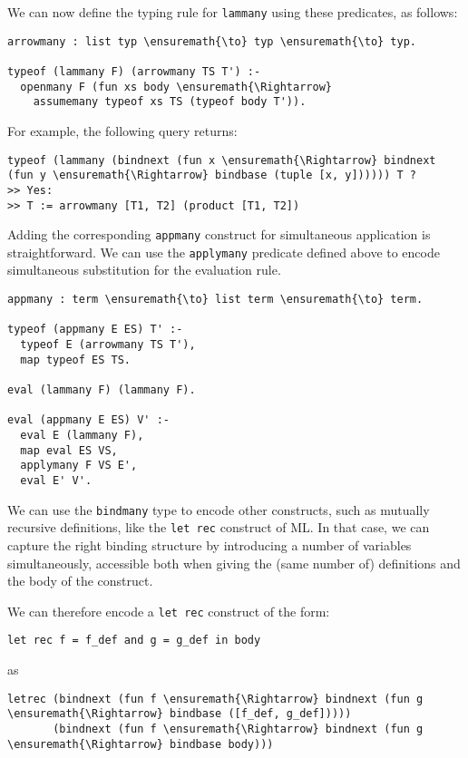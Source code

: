 We can now define the typing rule for \texttt{lammany} using these
predicates, as follows:

\begin{verbatim}
arrowmany : list typ \ensuremath{\to} typ \ensuremath{\to} typ.

typeof (lammany F) (arrowmany TS T') :-
  openmany F (fun xs body \ensuremath{\Rightarrow}
    assumemany typeof xs TS (typeof body T')).
\end{verbatim}

For example, the following query returns:

\begin{verbatim}
typeof (lammany (bindnext (fun x \ensuremath{\Rightarrow} bindnext (fun y \ensuremath{\Rightarrow} bindbase (tuple [x, y]))))) T ?
>> Yes:
>> T := arrowmany [T1, T2] (product [T1, T2])
\end{verbatim}

Adding the corresponding \texttt{appmany} construct for simultaneous
application is straightforward. We can use the \texttt{applymany}
predicate defined above to encode simultaneous substitution for the
evaluation rule.

\begin{verbatim}
appmany : term \ensuremath{\to} list term \ensuremath{\to} term.

typeof (appmany E ES) T' :-
  typeof E (arrowmany TS T'),
  map typeof ES TS.

eval (lammany F) (lammany F).

eval (appmany E ES) V' :-
  eval E (lammany F),
  map eval ES VS,
  applymany F VS E',
  eval E' V'.
\end{verbatim}

We can use the \texttt{bindmany} type to encode other constructs, such
as mutually recursive definitions, like the \texttt{let\ rec} construct
of ML. In that case, we can capture the right binding structure by
introducing a number of variables simultaneously, accessible both when
giving the (same number of) definitions and the body of the construct.

We can therefore encode a \texttt{let\ rec} construct of the form:

\begin{verbatim}
let rec f = f_def and g = g_def in body
\end{verbatim}

as

\begin{verbatim}
letrec (bindnext (fun f \ensuremath{\Rightarrow} bindnext (fun g \ensuremath{\Rightarrow} bindbase ([f_def, g_def]))))
       (bindnext (fun f \ensuremath{\Rightarrow} bindnext (fun g \ensuremath{\Rightarrow} bindbase body)))
\end{verbatim}

